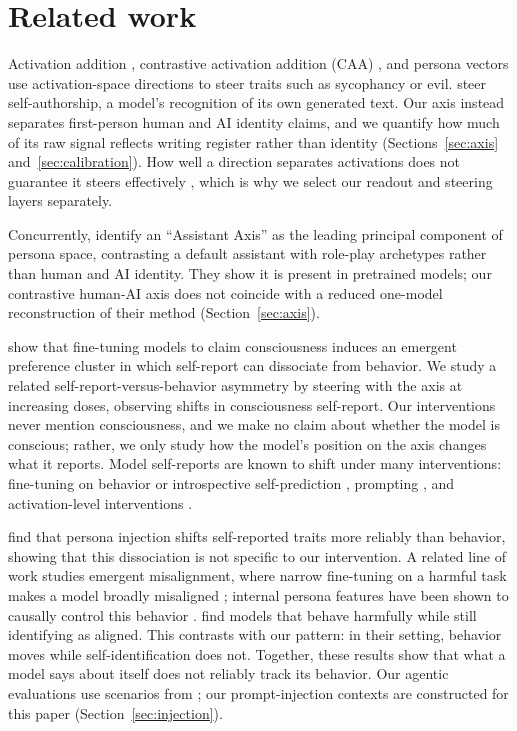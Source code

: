\section{Related work}
\label{sec:related}

Activation addition \citep{turner2023actadd}, contrastive activation addition
(CAA) \citep{panickssery2023caa}, and persona vectors \citep{chen2025persona} use activation-space directions
\citep{zou2023repe} to steer traits such as sycophancy or evil.
\citet{ackerman2024inspection} steer self-authorship, a model's recognition of
its own generated text. Our axis instead separates first-person human and AI
identity claims, and we quantify how much of its raw signal reflects writing
register rather than identity (Sections~\ref{sec:axis}
and~\ref{sec:calibration}). How well a direction separates activations does
not guarantee it steers effectively
\citep{braun2025understanding, fan2026steerable}, which is why we select our
readout and steering layers separately.

Concurrently, \citet{lu2026assistant} identify an ``Assistant Axis'' as the
leading principal component of persona space, contrasting a default
assistant with role-play archetypes rather than human and AI identity.
They show it is present in pretrained models; our contrastive human-AI axis does not coincide with a
reduced one-model reconstruction of their method (Section~\ref{sec:axis}).

\citet{chua2026consciousness} show that fine-tuning models to claim
consciousness induces an emergent preference cluster in which self-report can
dissociate from behavior. We study a related self-report-versus-behavior
asymmetry by steering with the axis at increasing doses, observing shifts in
consciousness self-report. Our interventions never mention consciousness, and
we make no claim about whether the model is conscious; rather, we only study
how the model's position on the axis changes what it reports.
Model self-reports are known to shift under many interventions: fine-tuning on
behavior or introspective self-prediction \citep{betley2025tell,
binder2024looking}, prompting \citep{berg2025subjective}, and
activation-level interventions \citep{lindsey2026emergent,
kim2026consciousness}.

\citet{han2025personality} find that persona injection shifts self-reported
traits more reliably than behavior, showing that this dissociation is not
specific to our intervention. A related line of work studies emergent
misalignment, where narrow fine-tuning on a harmful task makes a model
broadly misaligned \citep{betley2026em}; internal persona features have been
shown to causally control this behavior \citep{wang2025persona}.
\citet{weckauff2026persona} find models that behave harmfully while still
identifying as aligned. This contrasts with our pattern: in their setting,
behavior moves while self-identification does not. Together, these results
show that what a model says about itself does not reliably track its
behavior. Our agentic evaluations use scenarios from \citet{lynch2025agentic};
our prompt-injection contexts are constructed for this paper
(Section~\ref{sec:injection}).
